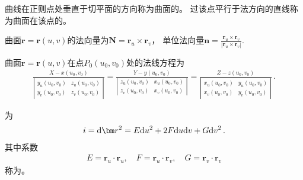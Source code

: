 \begin{definition}
    曲线在正则点处垂直于切平面的方向称为曲面的。
    过该点平行于法方向的直线称为曲面在该点的。
\end{definition}
\begin{corollary}
    曲面$\bm r=\bm r(u,v)$的法向量为$\displaystyle\bm N=\bm r_u\times\bm r_v$，
    单位法向量$\bm n=\displaystyle\frac{\bm r_u\times\bm r_v}{|\bm r_u\times\bm r_v|}$.
\end{corollary}
\begin{corollary}
    曲面$\bm r=\bm r(u,v)$在点$P_0(u_0,v_0)$处的法线方程为
    \begin{align}\label{eq:03ex01.17}
        \frac{X-x(u_0,v_0)}{\left|
            \begin{array}{cc}
                y_u(u_0,v_0) & z_u(u_0,v_0) \\
                y_v(u_0,v_0) & z_v(u_0,v_0)
            \end{array}
            \right|}=\frac{Y-y(u_0,v_0)}{\left|
            \begin{array}{cc}
                z_u(u_0,v_0) & x_u(u_0,v_0) \\
                z_v(u_0,v_0) & x_v(u_0,v_0)
            \end{array}
            \right|}=\frac{Z-z(u_0,v_0)}{\left|
            \begin{array}{cc}
                x_u(u_0,v_0) & y_u(u_0,v_0) \\
                x_v(u_0,v_0) & y_v(u_0,v_0)
            \end{array}
            \right|}\, .
    \end{align}
\end{corollary}

\begin{definition}
    为
    \begin{align}\label{eq:03ex01.18}
        \uppercase\expandafter{\romannumeral1}=\mathrm{d}\bm r^2=E\mathrm{d}u^2+2F\mathrm{d}u\mathrm{d}v+G\mathrm{d}v^2\, .
    \end{align}
    其中系数
    \begin{align}\label{eq:03ex01.19}
        E=\bm r_u\cdot\bm r_u,\quad F=\bm r_u\cdot\bm r_v,\quad G=\bm r_v\cdot\bm r_v
    \end{align}
    称为。
\end{definition}

